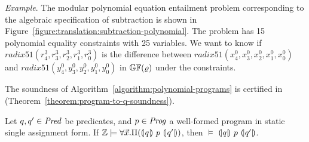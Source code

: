 \noindent
\emph{Example}.
The modular polynomial equation entailment problem corresponding to the
algebraic specification of subtraction is shown in
Figure~\ref{figure:translation:subtraction-polynomial}. The problem
has 15 polynomial equality constraints with 25 variables. We 
want to know if $\mathit{radix51}({r}^3_4, {r}^3_3, {r}^3_2,
{r}^3_1, {r}^3_0)$ is the difference between $\mathit{radix51}({x}^0_4,
{x}^0_3, {x}^0_2, {x}^0_1, {x}^0_0)$ and $\mathit{radix51}({y}^0_4,
{y}^0_3, {y}^0_2, {y}^0_1, {y}^0_0)$ in $\mathbb{GF}(\varrho)$ under the
constraints. 

The soundness of Algorithm~\ref{algorithm:polynomial-programs}
is certified in \coq (Theorem~\ref{theorem:program-to-q-soundness}).
\begin{theorem}
  \label{theorem:program-to-q-soundness}
  Let $q, q' \in \mathit{Pred}$ be predicates, and $p \in \mathit{Prog}$ a well-formed
  program in static single assignment form.
  If $\mathbb{Z} \models \forall \vec{x}.\Pi({(\!|}{q}{|\!)}~{p}~{(\!|}{q'}{|\!)})$, then
  $\models$ ${(\!|}{q}{|\!)}~{p}~{(\!|}{q'}{|\!)}$.
\end{theorem}

